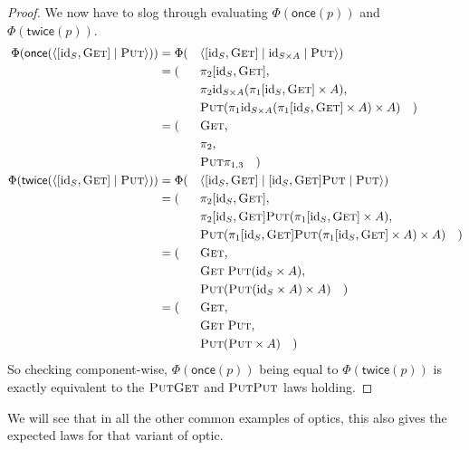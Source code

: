 \documentclass[11pt,letterpaper]{article}
\theoremstyle{plain}
\theoremstyle{definition}
\newtheorem{remark}[theorem]{Remark}
\newcommand{\Optic}{\mathbf{Optic}}
\newcommand{\id}{\mathrm{id}}
\newcommand{\rep}[2]{{\ensuremath \left\langle #1 \mid #2 \right\rangle}}
\newcommand{\repthree}[3]{{\ensuremath \langle #1 \mid #2 \mid #3 \rangle}}
\newcommand{\fget}{\textsc{Get}}
\newcommand{\fput}{\textsc{Put}}
\newcommand{\once}{\mathsf{once}}
\newcommand{\twice}{\mathsf{twice}}
\newcommand{\todo}[1]{\textcolor{red}{\small #1}}
\begin{document}
\begin{proof}
  We now have to slog through evaluating $\Phi(\once(p))$ and $\Phi(\twice(p))$.
  \begin{alignat*}{3}
    \Phi(\once(\rep{[\id_S, \fget]}{\fput})) &=
    \Phi(&&\repthree{[\id_S, \fget]}{\id_{S \times A}}{\fput}) \\
    &= (&&\pi_2 [\id_S, \fget], \\
    &&&\pi_2 \id_{S \times A} (\pi_1 [\id_S, \fget] \times A), \\
    &&& \fput (\pi_1 \id_{S \times A} (\pi_1 [\id_S, \fget] \times A) \times A) \quad) \\
    &= (&&\fget, \\
    &&& \pi_2, \\
    &&& \fput \pi_{1,3} \quad) \\
    \Phi(\twice(\rep{[\id_S, \fget]}{\fput})) &=
    \Phi(&&\repthree{[\id_S, \fget]}{[\id_S, \fget]\fput}{\fput}) \\
    &= (&&\pi_2 [\id_S, \fget], \\
    &&&\pi_2 [\id_S, \fget]\fput (\pi_1 [\id_S, \fget] \times A), \\
    &&& \fput (\pi_1 [\id_S, \fget]\fput (\pi_1 [\id_S, \fget] \times A) \times A) \quad) \\
    &= (&&\fget, \\
    &&& \fget \; \fput (\id_S \times A), \\
    &&& \fput (\fput (\id_S \times A) \times A) \quad) \\
    &= (&&\fget, \\
    &&& \fget \; \fput, \\
    &&& \fput (\fput \times A) \quad)
  \end{alignat*}
  So checking component-wise, $\Phi(\once(p))$ being equal to $\Phi(\twice(p))$ is exactly equivalent to the $\fput\fget$ and $\fput\fput$ laws holding.
\end{proof}

We will see that in all the other common examples of optics, this also gives the expected laws for that variant of optic.

\end{document}
